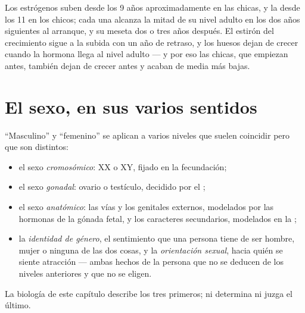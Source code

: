 \begin{example}\label{ex:g11:becoming-male-female:curves}
Los estrógenos suben desde los 9 años aproximadamente en las chicas, y
la  desde los 11 en los chicos; cada una alcanza la mitad
de su nivel adulto en los dos años siguientes al arranque, y su meseta
dos o tres años después. El estirón del crecimiento sigue a la subida
con un año de retraso, y los huesos dejan de crecer cuando la hormona
llega al nivel adulto --- y por eso las chicas, que empiezan antes,
también dejan de crecer antes y acaban de media más bajas.
\end{example}

\section{El sexo, en sus varios sentidos}

\begin{proposition}\label{prop:g11:becoming-male-female:levels}
``Masculino'' y ``femenino'' se aplican a varios niveles que suelen
coincidir pero que son distintos:
\begin{itemize}
  \item el sexo \emph{cromosómico}: XX o XY, fijado en la fecundación;
  \item el sexo \emph{gonadal}: ovario o testículo, decidido por el
        ;
  \item el sexo \emph{anatómico}: las vías y los genitales externos,
        modelados por las hormonas de la gónada fetal, y los caracteres
        secundarios, modelados en la ;
  \item la \emph{identidad de género}, el sentimiento que una persona
        tiene de ser hombre, mujer o ninguna de las dos cosas, y la
        \emph{orientación sexual}, hacia quién se siente atracción ---
        ambas hechos de la persona que no se deducen de los niveles
        anteriores y que no se eligen.
\end{itemize}
La biología de este capítulo describe los tres primeros; ni determina
ni juzga el último.
\end{proposition}
\admitted

